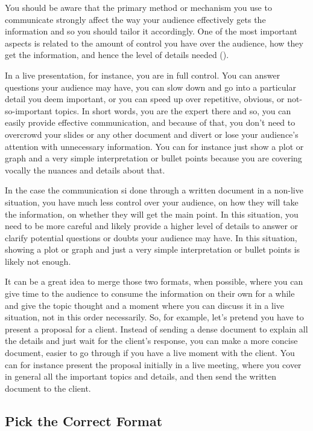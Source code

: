 \documentclass[
]{krantz}
\begin{document}
You should be aware that the primary method or mechanism you use to communicate strongly affect the way your audience effectively gets the information and so you should tailor it accordingly. One of the most important aspects is related to the amount of control you have over the audience, how they get the information, and hence the level of details needed (\citet{Knaflic2015}).

In a live presentation, for instance, you are in full control. You can answer questions your audience may have, you can slow down and go into a particular detail you deem important, or you can speed up over repetitive, obvious, or not-so-important topics. In short words, you are the expert there and so, you can easily provide effective communication, and because of that, you don't need to overcrowd your slides or any other document and divert or lose your audience's attention with unnecessary information. You can for instance just show a plot or graph and a very simple interpretation or bullet points because you are covering vocally the nuances and details about that.

In the case the communication si done through a written document in a non-live situation, you have much less control over your audience, on how they will take the information, on whether they will get the main point. In this situation, you need to be more careful and likely provide a higher level of details to answer or clarify potential questions or doubts your audience may have. In this situation, showing a plot or graph and just a very simple interpretation or bullet points is likely not enough.

It can be a great idea to merge those two formats, when possible, where you can give time to the audience to consume the information on their own for a while and give the topic thought and a moment where you can discuss it in a live situation, not in this order necessarily. So, for example, let's pretend you have to present a proposal for a client. Instead of sending a dense document to explain all the details and just wait for the client's response, you can make a more concise document, easier to go through if you have a live moment with the client. You can for instance present the proposal initially in a live meeting, where you cover in general all the important topics and details, and then send the written document to the client.

\hypertarget{pick-the-correct-format}{%
\subsection{Pick the Correct Format}\label{pick-the-correct-format}}
\end{document}

